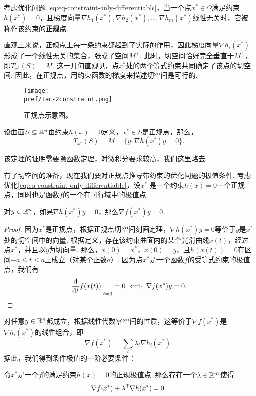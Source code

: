 \begin{definition}[正规点]\label{def:regular-point}
考虑优化问题 \eqref{eq:eq-constraint-only-differentiable}，当一个点${x^\ast}\in\Omega$满足约束${h(x^\ast)}=0$，且梯度向量$\nabla h_1({x^\ast}),\nabla h_2({x^\ast}),\dots,\nabla h_m({x^\ast})$线性无关时，它被称作该约束的\textbf{正规点}. 
\end{definition}

直观上来说，正规点上每一条约束都起到了实际的作用，因此梯度向量$\nabla h_i({x^\ast})$形成了一个线性无关的集合，张成了空间$M^\perp$. 此时，切空间恰好完全垂直于$M^\perp$，即$T_{x^\ast}(S)=M$. 这一几何直观见，点${x^\ast }$处的两个等式约束共同确定了该点的切空间. 因此，在正规点，用约束函数的梯度来描述切空间是可行的. 
    \begin{figure}
        \centering
        \texttt{[image: \\pref/tan-2constraint.png]}
        \caption{正规点示意图。}
        \label{fig:tan-2constraint}
    \end{figure}

\begin{theorem}[正规点切空间刻画定理]
设曲面$S\subseteq\mathbb{R}^n$由约束$h(x)=0$定义，${x^\ast}\in S$是正规点，那么，
\[T_{x^\ast}(S)=M=\{{y:\nabla h(x^\ast)y=0}\}.\]
\end{theorem}
该定理的证明需要隐函数定理，对微积分要求较高，我们这里略去.

有了切空间的准备，现在我们要对正规点推导带约束的优化问题的极值条件. 考虑优化\eqref{eq:eq-constraint-only-differentiable}，设$x^\ast$ 是一个约束${h(x)=0}$一个正规点，同时也是函数$f$的一个在可行域中的极值点.

\begin{lemma}\label{lemma:eq-opt-cond-1}
对$y\in\mathbb{R}^n$，如果$\nabla {h(x^\ast)y=0}$，那么$\nabla f({x^\ast}){y}=0$.
\end{lemma}

\begin{proof}
因为$x^\ast$是正规点，根据正规点切空间刻画定理，$\nabla h(x^*)y=0$等价于$y$是${x^\ast}$处的切空间中的向量. 根据定义，存在该约束曲面内的某个光滑曲线${x}(t)$，经过点${x^\ast}$，并且以$y$为切向量. 那么，${x}(0)={x^\ast}$，${\dot{x}}(0)={y}$，且${h(x(t))=0}$在区间$-a\le t\le a$上成立（对某个正数$a$）. 因为点${x^\ast}$是一个函数$f$的受等式约束的极值点，我们有
\[\left.\frac{\mathrm{d}}{\mathrm{d} t}f({x}(t))\right|_{t=0}=0\iff \nabla f({x^\ast})y=0.\]
\end{proof}

 对任意$y\in\mathbb{R}^n$都成立，根据线性代数零空间的性质，这等价于$\nabla f(x^*)$是$\nabla h_i(x^*)$的线性组合，即
\[\nabla f(x^*)=\sum_i\lambda_i\nabla h_i(x^*).\]
据此，我们得到条件极值的一阶必要条件：
\begin{theorem}[条件极值的一阶必要条件]\label{thm:eq-opt-cond-1}
    令${x^\ast}$是一个$f$的满足约束${h(x)=0}$的正规极值点. 那么存在一个${\lambda}\in \mathbb{R}^m$使得$$\nabla f({x^\ast})+{\lambda^{\mathsf{T}} \nabla h(x^\ast)=0}. $$
\end{theorem}

